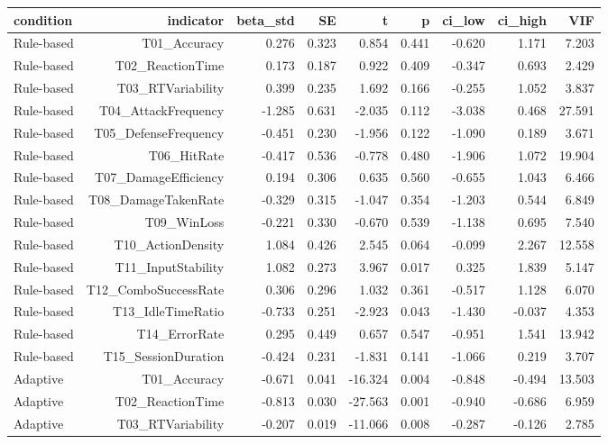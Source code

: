 \documentclass[10pt]{article}
\begin{document}
{\scriptsize\setlength{\tabcolsep}{3pt}\begin{longtable}{lrrrrrrrr}
\toprule
condition & indicator & beta\_std & SE & t & p & ci\_low & ci\_high & VIF \\
\midrule
\endhead
Rule-based & T01\_Accuracy & 0.276 & 0.323 & 0.854 & 0.441 & -0.620 & 1.171 & 7.203 \\
Rule-based & T02\_ReactionTime & 0.173 & 0.187 & 0.922 & 0.409 & -0.347 & 0.693 & 2.429 \\
Rule-based & T03\_RTVariability & 0.399 & 0.235 & 1.692 & 0.166 & -0.255 & 1.052 & 3.837 \\
Rule-based & T04\_AttackFrequency & -1.285 & 0.631 & -2.035 & 0.112 & -3.038 & 0.468 & 27.591 \\
Rule-based & T05\_DefenseFrequency & -0.451 & 0.230 & -1.956 & 0.122 & -1.090 & 0.189 & 3.671 \\
Rule-based & T06\_HitRate & -0.417 & 0.536 & -0.778 & 0.480 & -1.906 & 1.072 & 19.904 \\
Rule-based & T07\_DamageEfficiency & 0.194 & 0.306 & 0.635 & 0.560 & -0.655 & 1.043 & 6.466 \\
Rule-based & T08\_DamageTakenRate & -0.329 & 0.315 & -1.047 & 0.354 & -1.203 & 0.544 & 6.849 \\
Rule-based & T09\_WinLoss & -0.221 & 0.330 & -0.670 & 0.539 & -1.138 & 0.695 & 7.540 \\
Rule-based & T10\_ActionDensity & 1.084 & 0.426 & 2.545 & 0.064 & -0.099 & 2.267 & 12.558 \\
Rule-based & T11\_InputStability & 1.082 & 0.273 & 3.967 & 0.017 & 0.325 & 1.839 & 5.147 \\
Rule-based & T12\_ComboSuccessRate & 0.306 & 0.296 & 1.032 & 0.361 & -0.517 & 1.128 & 6.070 \\
Rule-based & T13\_IdleTimeRatio & -0.733 & 0.251 & -2.923 & 0.043 & -1.430 & -0.037 & 4.353 \\
Rule-based & T14\_ErrorRate & 0.295 & 0.449 & 0.657 & 0.547 & -0.951 & 1.541 & 13.942 \\
Rule-based & T15\_SessionDuration & -0.424 & 0.231 & -1.831 & 0.141 & -1.066 & 0.219 & 3.707 \\
Adaptive & T01\_Accuracy & -0.671 & 0.041 & -16.324 & 0.004 & -0.848 & -0.494 & 13.503 \\
Adaptive & T02\_ReactionTime & -0.813 & 0.030 & -27.563 & 0.001 & -0.940 & -0.686 & 6.959 \\
Adaptive & T03\_RTVariability & -0.207 & 0.019 & -11.066 & 0.008 & -0.287 & -0.126 & 2.785 \\

\end{longtable}}
\end{document}
